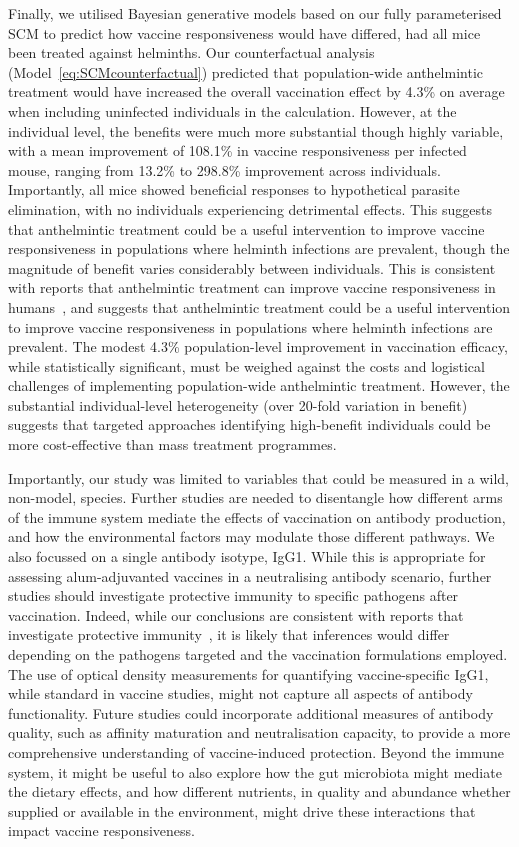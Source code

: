 \documentclass[a4paper, hidelinks, 11pt]{article}
\begin{document}
Finally, we utilised Bayesian generative models based on our fully parameterised SCM to predict how vaccine responsiveness would have differed, had all mice been treated against helminths. Our counterfactual analysis (Model~\ref{eq:SCMcounterfactual}) predicted that population-wide anthelmintic treatment would have increased the overall vaccination effect by 4.3\% on average when including uninfected individuals in the calculation. However, at the individual level, the benefits were much more substantial though highly variable, with a mean improvement of 108.1\% in vaccine responsiveness per infected mouse, ranging from 13.2\% to 298.8\% improvement across individuals. Importantly, all mice showed beneficial responses to hypothetical parasite elimination, with no individuals experiencing detrimental effects. This suggests that anthelmintic treatment could be a useful intervention to improve vaccine responsiveness in populations where helminth infections are prevalent, though the magnitude of benefit varies considerably between individuals. This is consistent with reports that anthelmintic treatment can improve vaccine responsiveness in humans~\cite{Cooper2001b, Elias2008, Tweyongyere2019, Urban2007}, and suggests that anthelmintic treatment could be a useful intervention to improve vaccine responsiveness in populations where helminth infections are prevalent. The modest 4.3\% population-level improvement in vaccination efficacy, while statistically significant, must be weighed against the costs and logistical challenges of implementing population-wide anthelmintic treatment. However, the substantial individual-level heterogeneity (over 20-fold variation in benefit) suggests that targeted approaches identifying high-benefit individuals could be more cost-effective than mass treatment programmes.

Importantly, our study was limited to variables that could be measured in a wild, non-model, species. Further studies are needed to disentangle how different arms of the immune system mediate the effects of vaccination on antibody production, and how the environmental factors may modulate those different pathways. We also focussed on a single antibody isotype, IgG1. While this is appropriate for assessing alum-adjuvanted vaccines in a neutralising antibody scenario, further studies should investigate protective immunity to specific pathogens after vaccination. Indeed, while our conclusions are consistent with reports that investigate protective immunity~\cite{vanDorst2024}, it is likely that inferences would differ depending on the pathogens targeted and the vaccination formulations employed. The use of optical density measurements for quantifying vaccine-specific IgG1, while standard in vaccine studies, might not capture all aspects of antibody functionality. Future studies could incorporate additional measures of antibody quality, such as affinity maturation and neutralisation capacity, to provide a more comprehensive understanding of vaccine-induced protection. Beyond the immune system, it might be useful to also explore how the gut microbiota might mediate the dietary effects, and how different nutrients, in quality and abundance whether supplied or available in the environment, might drive these interactions that impact vaccine responsiveness.
\end{document}
